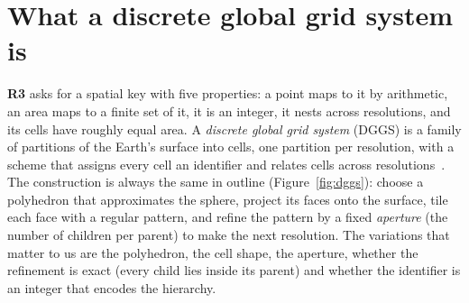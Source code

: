 \documentclass[10pt,a4paper]{article}
\newcommand{\req}[1]{\textbf{R#1}}
\begin{document}
\section{What a discrete global grid system is}
\label{ch:dggs}

\req{3} asks for a spatial key with five properties: a point maps to it by arithmetic, an area maps to a finite set
of it, it is an integer, it nests across resolutions, and its cells have roughly equal area. A \emph{discrete
global grid system} (DGGS) is a family of partitions of the Earth's surface into cells, one partition per
resolution, with a scheme that assigns every cell an identifier and relates cells across
resolutions~\citep{sahr2003,ogc2021dggs}. The construction is always the same in outline (Figure~\ref{fig:dggs}):
choose a polyhedron that approximates the sphere, project its faces onto the surface, tile each face with a
regular pattern, and refine the pattern by a fixed \emph{aperture} (the number of children per parent) to make the
next resolution. The variations that matter to us are the polyhedron, the cell shape, the aperture, whether the
refinement is exact (every child lies inside its parent) and whether the identifier is an integer that encodes the
hierarchy.
\end{document}

